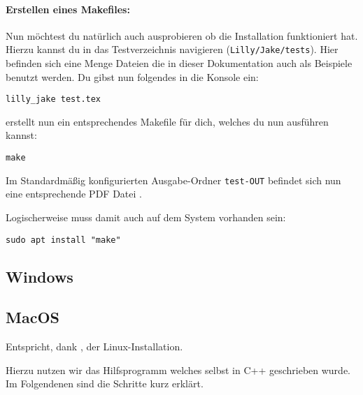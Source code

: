 \paragraph{Erstellen eines Makefiles:}
Nun möchtest du natürlich auch ausprobieren ob die Installation funktioniert hat.
Hierzu kannst du in das Testverzeichnis navigieren (\verb|Lilly/Jake/tests|).
Hier befinden sich eine Menge Dateien die in dieser Dokumentation auch als Beispiele benutzt werden.
Du gibst nun folgendes in die Konsole ein:
\begin{lstlisting}[language=lBash]
lilly_jake test.tex
\end{lstlisting}
\Jake erstellt nun ein entsprechendes Makefile für dich, welches du nun ausführen kannst:
\begin{lstlisting}[language=lBash]
make
\end{lstlisting}
Im Standardmäßig konfigurierten Ausgabe-Ordner \verb|test-OUT| befindet sich nun eine entsprechende PDF
Datei \Smiley.\smallskip
\begin{bemerkung}[make]
    Logischerweise muss damit auch  auf dem System vorhanden sein:
\begin{lstlisting}[language=lBash]
sudo apt install "make"
\end{lstlisting}
\end{bemerkung}

\subsection{Windows }
\subsection{MacOS}
\begin{center}
    Entspricht, dank \Jake, der Linux-Installation.
\end{center}
Hierzu nutzen wir das Hilfsprogramm \Jake welches selbst in C++ geschrieben wurde.
Im Folgendenen sind die Schritte kurz erklärt.
